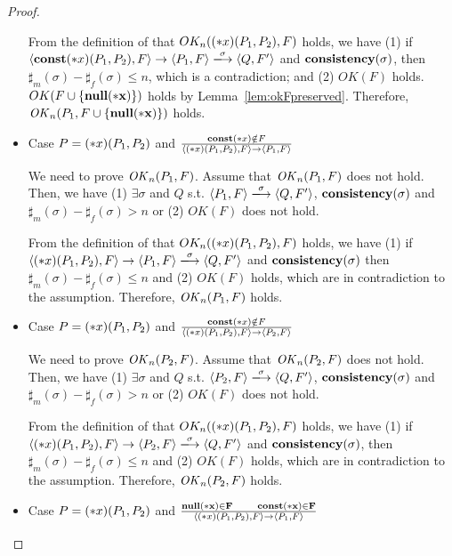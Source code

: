 \begin{proof}
\begin{itemize}
  From the definition of that \(OK_n((*x)(P_1, P_2), F)\) holds, we
  have (1) if \( \langle \scon\Sirx(P_1, P_2), F \rangle \rightarrow
  \langle P_1, F \rangle \xlongrightarrow{\sigma} \langle Q, F'
  \rangle \) and \(\mathbf{consistency}(\sigma)\), then \(\sharp_m(\sigma) -
  \sharp_f(\sigma) \le n \), which is a contradiction; and (2)
  \(OK(F)\) holds. \(OK(F\cup\{\bf{null}(*x)\})\) holds by
  Lemma~\ref{lem:okFpreserved}. Therefore, \(\mathit{OK}_n(P_1,
  F\cup\{\bf{null}(*x)\})\) holds.


\item Case \( P = (*x)(P_1,P_2) \) and \( \frac{ \mathbf{const}(*x) \notin F}
  { \langle (*x)(P_1, P_2), F \rangle \rightarrow \langle P_1, F
    \rangle } \)

  We need to prove \(\mathit{OK}_n(P_1, F)\).  Assume that \(\mathit{OK}_n(P_1, F)\)
  does not hold. Then, we have (1) \( \exists \sigma \) and \(Q\)
  s.t. \( \langle P_1, F \rangle \xlongrightarrow{\sigma} \langle Q,
  F' \rangle \), \(\mathbf{consistency}(\sigma)\) and \(\sharp_{m}(\sigma) -
  \sharp_{f}(\sigma) > n\) or (2) \( OK(F)\) does not hold.

  From the definition of that \(OK_n((*x)(P_1, P_2), F)\) holds, we
  have (1) if \( \langle \Sirx(P_1, P_2), F \rangle \rightarrow
  \langle P_1, F \rangle \xlongrightarrow{\sigma} \langle Q, F'
  \rangle \) and \(\mathbf{consistency}(\sigma)\) then \(\sharp_m(\sigma) -
  \sharp_f(\sigma) \le n \) and (2) \(OK(F)\) holds, which are in
  contradiction to the assumption.  Therefore, \(\mathit{OK}_n(P_1, F)\)
  holds.

\item Case \( P = (*x)(P_1,P_2) \) and \( \frac{ \mathbf{const}(*x) \notin F}
  { \langle (*x)(P_1, P_2), F \rangle \rightarrow \langle P_2, F
    \rangle } \)

  We need to prove \(\mathit{OK}_n(P_2, F)\).  Assume that \(\mathit{OK}_n(P_2, F)\)
  does not hold. Then, we have (1) \( \exists \sigma \) and \(Q\)
  s.t. \( \langle P_2, F \rangle \xlongrightarrow{\sigma} \langle Q,
  F' \rangle \), \(\mathbf{consistency}(\sigma)\) and \(\sharp_{m}(\sigma) -
  \sharp_{f}(\sigma) > n\) or (2) \( OK(F)\) does not hold.

  From the definition of that \(OK_n((*x)(P_1, P_2), F)\) holds, we
  have (1) if \( \langle \Sirx(P_1, P_2), F \rangle \rightarrow
  \langle P_2, F \rangle \xlongrightarrow{\sigma} \langle Q, F'
  \rangle \) and \(\mathbf{consistency}(\sigma)\), then \(\sharp_m(\sigma) -
  \sharp_f(\sigma) \le n \) and (2) \(OK(F)\) holds, which are in
  contradiction to the assumption.  Therefore, \(\mathit{OK}_n(P_2, F)\)
  holds.

\item Case \( P = (*x)(P_1,P_2) \) and \( \frac{ \bf{null}(*x) \in F
  \quad\quad \mathbf{const}(*x) \in F} { \langle (*x)(P_1, P_2), F \rangle
  \rightarrow \langle P_1, F \rangle } \)


\end{itemize}
\end{proof}
